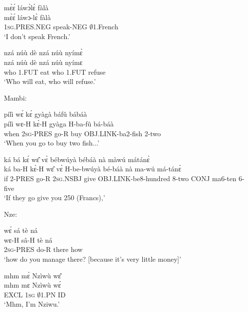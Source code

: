 \begin{exe} 
\exC\label{241} 
  \glll  mɛ̀ɛ́ láwɔ̀lɛ̀ fàlà \\
        mɛ̀ɛ́ láwɔ-lɛ̀ fàlà \\
         1\textsc{sg}.PRES.NEG speak-NEG $\emptyset$1.French \\
    \trans `I don't speak French.'
\end{exe}

\begin{exe} 
\exC\label{242}
  \glll nzá núù dè nzá núù nyímɛ̀ \\
         nzá núù dè nzá núù nyímɛ \\
       who 1.FUT eat who 1.FUT refuse   \\
    \trans `Who will eat, who will refuse.'
\end{exe}

\noindent Mambi:

\begin{exe} 
\exC\label{243} 
  \glll  pílì wɛ́ kɛ́ gyàgà báfû bábáà \\
        pílì wɛ-H kɛ̀-H gyàga H-ba-fû bá-báà \\
        when 2\textsc{sg}-PRES go-R buy OBJ.LINK-ba2-fish 2-two  \\
    \trans `When you go to buy two fish...'
\end{exe}

\begin{exe} 
\exC\label{244}
  \glll ká bá kɛ́ wɛ̂ vɛ̀ bébwúyà bébáà nà màwú mátánɛ̀ \\
      ká ba-H kɛ̀-H wɛ̂ vɛ̀ H-be-bwúyà bé-báà nà ma-wú má-tánɛ̀ \\
        if 2-PRES go-R 2\textsc{sg}.NSBJ give OBJ.LINK-be8-hundred 8-two CONJ ma6-ten 6-five  \\
    \trans `If they go give you 250 (Francs),'
\end{exe}

\noindent Nze:

\begin{exe} 
\exC\label{245} 
  \glll wɛ́ sá tè ná  \\
        wɛ-H sâ-H tè ná \\
        2\textsc{sg}-PRES do-R there how \\
    \trans `how do you manage there? [because it's very little money]'
\end{exe}

\begin{exe} 
\exC\label{246} 
  \glll  mhm mɛ̀ Nzìwù wɛ̂\\
         mhm mɛ Nzìwù wɛ́ \\
       EXCL 1\textsc{sg} $\emptyset$1.PN  ID  \\
    \trans `Mhm, I'm Nziwu.'
\end{exe}

